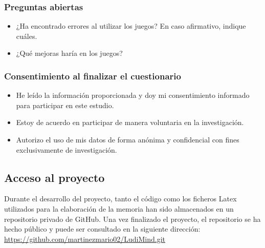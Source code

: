\subsubsection{Preguntas abiertas}
\begin{itemize}
    \item ¿Ha encontrado errores al utilizar los juegos? En caso afirmativo, indique cuáles.
    \item ¿Qué mejoras haría en los juegos?
\end{itemize}

\subsubsection{Consentimiento al finalizar el cuestionario}
\begin{itemize}
    \item He leído la información proporcionada y doy mi consentimiento informado para participar en este estudio.
    \item Estoy de acuerdo en participar de manera voluntaria en la investigación.
    \item Autorizo el uso de mis datos de forma anónima y confidencial con fines exclusivamente de investigación.
\end{itemize}

\newpage
\subsection{Acceso al proyecto}
Durante el desarrollo del proyecto, tanto el código como los ficheros Latex utilizados para la elaboración de la memoria han sido almacenados en un repositorio privado de GitHub.
Una vez finalizado el proyecto, el repositorio se ha hecho público y puede ser consultado en la siguiente dirección: \url{https://github.com/martinezmario02/LudiMind.git}